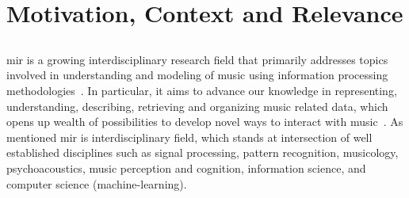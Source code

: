 \section{Motivation, Context and Relevance}
\label{sec:intro_motivation_context_relevance}


\subsection{}
\label{sec:intro_motivation_mir}

\Gls{mir} is a growing interdisciplinary research field that primarily addresses topics involved in understanding and modeling of music using information processing methodologies~\citep{roadmap_mir}. In particular, it aims to advance our knowledge in representing, understanding, describing, retrieving and organizing music related data, which opens up wealth of possibilities to develop novel ways to interact with music~\citep{casey2008content,orio2006music,burgoyne2016music}. As mentioned \gls{mir} is interdisciplinary field, which stands at intersection of well established disciplines such as signal processing, pattern recognition, musicology, psychoacoustics, music perception and cognition, information science, and computer science (machine-learning). 

